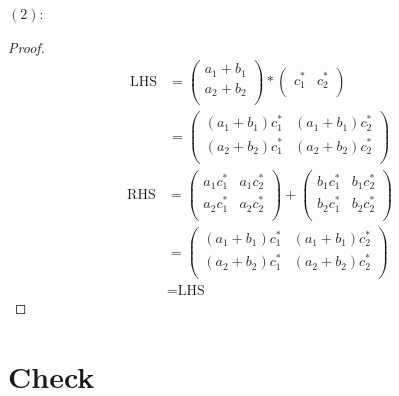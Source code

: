 \documentclass{article}
\numberwithin{equation}{subsection} %
\theoremstyle{definition}
\begin{document}
$(2)$:
\begin{proof}
\begin{align*}
    \text{LHS} &= \left( \begin{array}{c}
                     a_1 + b_1\\
                     a_2 + b_2\\
                \end{array} \right) * \left( \begin{array}{cc}
                     c_1^* & c_2^* \\
                \end{array} \right) \\
               &= \left( \begin{array}{cc}
                    (a_1+b_1)c_1^* & (a_1+b_1)c_2^* \\
                    (a_2+b_2)c_1^* & (a_2+b_2)c_2^* \\
                \end{array} \right)
\end{align*}
\begin{align*}
    \text{RHS} &= \left( \begin{array}{cc}
                    a_1c_1^* & a_1c_2^* \\
                    a_2c_1^* & a_2c_2^* \\
                \end{array} \right) + \left( \begin{array}{cc}
                    b_1c_1^* & b_1c_2^* \\
                    b_2c_1^* & b_2c_2^* \\
                \end{array} \right) \\
               &= \left( \begin{array}{cc}
                    (a_1+b_1)c_1^* & (a_1+b_1)c_2^* \\
                    (a_2+b_2)c_1^* & (a_2+b_2)c_2^* \\
                \end{array} \right) \\
               &= \text{LHS}
\end{align*}
\end{proof}

\section{Check}
\end{document}
